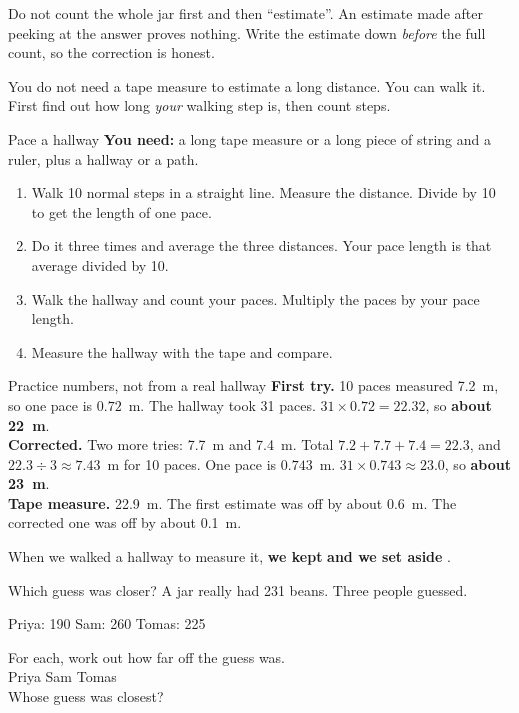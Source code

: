 Do not count the whole jar first and then ``estimate''. An estimate made after peeking at the answer proves nothing. Write the estimate down \emph{before} the full count, so the correction is honest.

You do not need a tape measure to estimate a long distance. You can walk it. First find out how long \emph{your} walking step is, then count steps.

\begin{tryit}{Pace a hallway}
\textbf{You need:} a long tape measure or a long piece of string and a ruler, plus a hallway or a path.
\begin{enumerate}[leftmargin=1.6em]
\item Walk 10 normal steps in a straight line. Measure the distance. Divide by 10 to get the length of one pace.
\item Do it three times and average the three distances. Your pace length is that average divided by 10.
\item Walk the hallway and count your paces. Multiply the paces by your pace length.
\item Measure the hallway with the tape and compare.
\end{enumerate}
\end{tryit}

\begin{worked}{Practice numbers, not from a real hallway}
\textbf{First try.} 10 paces measured 7.2~m, so one pace is $0.72$~m. The hallway took 31 paces. $31\times0.72=22.32$, so \textbf{about 22~m}.\\
\textbf{Corrected.} Two more tries: 7.7~m and 7.4~m. Total $7.2+7.7+7.4=22.3$, and $22.3\div3\approx7.43$~m for 10 paces. One pace is $0.743$~m. $31\times0.743\approx23.0$, so \textbf{about 23~m}.\\
\textbf{Tape measure.} 22.9~m. The first estimate was off by about 0.6~m. The corrected one was off by about 0.1~m.
\end{worked}

\begin{keepbox}
When we walked a hallway to measure it, \textbf{we kept} \wline[3.2cm] \textbf{and we set aside} \wline[3.2cm].
\end{keepbox}

\clearpage

\begin{puzzle}{Which guess was closer?}
A jar really had 231 beans. Three people guessed.
\begin{center}\sans
Priya: 190 \qquad Sam: 260 \qquad Tomas: 225
\end{center}
For each, work out how far off the guess was.\\
Priya \wline[1.5cm] \quad Sam \wline[1.5cm] \quad Tomas \wline[1.5cm]\\
Whose guess was closest? \wline[3cm]
\end{puzzle}

